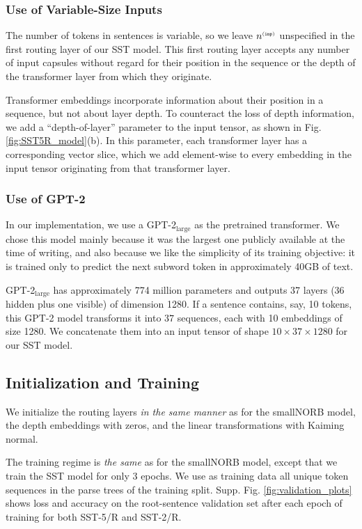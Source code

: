 \documentclass[11pt,a4paper]{article}
\begin{document}
\subsubsection{Use of Variable-Size Inputs}

The number of tokens in sentences is variable, so we leave $n^{{\scriptscriptstyle\tt (inp)}}$ unspecified in the first routing layer of our SST model. This first routing layer accepts any number of input capsules without regard for their position in the sequence or the depth of the transformer layer from which they originate.

Transformer embeddings incorporate information about their position in a sequence, but not about layer depth. To counteract the loss of depth information, we add a ``depth-of-layer'' parameter to the input tensor, as shown in Fig. \ref{fig:SST5R_model}(b). In this parameter, each transformer layer has a corresponding vector slice, which we add element-wise to every embedding in the input tensor originating from that transformer layer.

\subsubsection{Use of GPT-2}

In our implementation, we use a GPT-2$_\text{large}$ \cite{GPT-2-Radford-et-al} as the pretrained transformer. We chose this model mainly because it was the largest one publicly available at the time of writing, and also because we like the simplicity of its training objective: it is trained only to predict the next subword token in approximately 40GB of text.

GPT-2$_\text{large}$ has approximately 774 million parameters and outputs 37 layers (36 hidden plus one visible) of dimension 1280. If a sentence contains, say, 10 tokens, this GPT-2 model transforms it into $37$ sequences, each with 10 embeddings of size 1280. We concatenate them into an input tensor of shape $10 \times 37 \times 1280$ for our SST model.

\subsection{Initialization and Training}

We initialize the routing layers {\em in the same manner} as for the smallNORB model, the depth embeddings with zeros, and the linear transformations with Kaiming normal.

The training regime is {\em the same} as for the smallNORB model, except that we train the SST model for only 3 epochs. We use as training data all unique token sequences in the parse trees of the training split.  Supp. Fig. \ref{fig:validation_plots} shows loss and accuracy on the root-sentence validation set after each epoch of training for both SST-5/R and SST-2/R.
\end{document}
